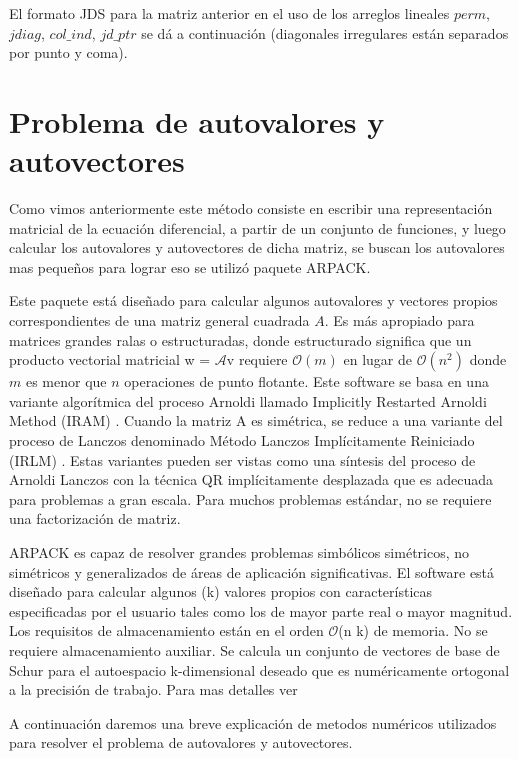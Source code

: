 \documentclass[a4paper,openright,12pt, oneside]{book}
\DeclareRobustCommand{\orderof}{\ensuremath{\mathcal{O}}}
\begin{document}
El formato JDS para la matriz anterior en el uso de los arreglos lineales {$perm$, $jdiag$, $col\_ind$, $jd\_ptr$} se d\'a a continuaci\'on (diagonales irregulares est\'an separados por punto y coma).




\section{Problema de autovalores y autovectores}

Como vimos anteriormente este m\'etodo consiste en escribir una representaci\'on matricial de la ecuaci\'on diferencial, a partir de un conjunto de funciones, y luego calcular los autovalores y autovectores de dicha matriz, se buscan los autovalores mas peque\~nos para lograr eso se utiliz\'o paquete ARPACK.

Este paquete est\'a dise\~nado para calcular algunos autovalores y vectores propios correspondientes de una matriz general cuadrada $A$. Es m\'as apropiado para matrices grandes ralas o estructuradas, donde estructurado significa que un producto vectorial matricial w = $\mathcal{A}$v requiere $\orderof(m)$ en lugar de $\orderof(n^{2})$ donde $m$ es menor que $n$ operaciones de punto flotante. Este software se basa en una variante algor\'itmica del proceso Arnoldi llamado Implicitly Restarted Arnoldi Method (IRAM) \cite{IRAM}. Cuando la matriz A es sim\'etrica, se reduce a una variante del proceso de Lanczos denominado M\'etodo Lanczos Impl\'icitamente Reiniciado (IRLM) \cite{IRLM}. Estas variantes pueden ser vistas como una s\'intesis del proceso de Arnoldi\/ Lanczos con la t\'ecnica QR \cite{QR} impl\'icitamente desplazada que es adecuada para problemas a gran escala. Para muchos problemas est\'andar, no se requiere una factorizaci\'on de matriz.

ARPACK es capaz de resolver grandes problemas simb\'olicos sim\'etricos, no sim\'etricos y generalizados de \'areas de aplicaci\'on significativas. El software est\'a dise\~nado para calcular algunos (k) valores propios con caracter\'isticas especificadas por el usuario tales como los de mayor parte real o mayor magnitud. Los requisitos de almacenamiento est\'an en el orden \orderof(n k) de memoria. No se requiere almacenamiento auxiliar. Se calcula un conjunto de vectores de base de Schur para el autoespacio k-dimensional deseado que es num\'ericamente ortogonal a la precisi\'on de trabajo. Para mas detalles ver \cite{libromagico}

A continuaci\'on daremos una breve explicaci\'on de metodos num\'ericos utilizados para resolver el problema de autovalores y autovectores.
\end{document}

